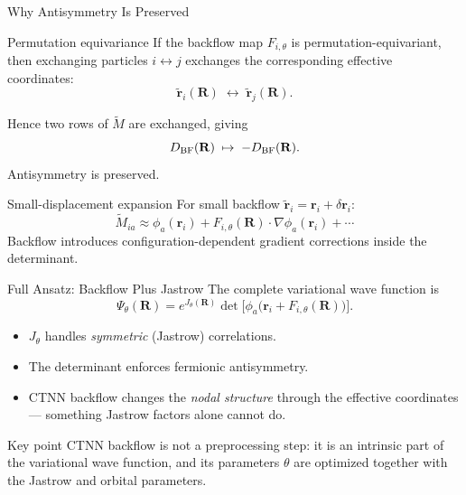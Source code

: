 \documentclass[aspectratio=169,10pt]{beamer}
\begin{document}
\begin{frame}{Why Antisymmetry Is Preserved}
\begin{block}{Permutation equivariance}
  If the backflow map $F_{i,\theta}$ is permutation-equivariant,
  then exchanging particles $i\leftrightarrow j$ exchanges the
  corresponding effective coordinates:
  \[
    \tilde{\mathbf{r}}_i(\mathbf{R})
    \;\longleftrightarrow\;
    \tilde{\mathbf{r}}_j(\mathbf{R}).
  \]
\end{block}
\vspace{0.2cm}
Hence two rows of $\widetilde{M}$ are exchanged, giving
\[
  D_{\rm BF}(\mathbf{R})\;\mapsto\;-D_{\rm BF}(\mathbf{R}).
\]
Antisymmetry is preserved. \checkmark
\vspace{0.3cm}
\begin{block}{Small-displacement expansion}
  For small backflow $\tilde{\mathbf{r}}_i=\mathbf{r}_i+\delta\mathbf{r}_i$:
  \[
    \widetilde{M}_{ia}
    \approx \phi_a(\mathbf{r}_i)
      + F_{i,\theta}(\mathbf{R})\cdot\nabla\phi_a(\mathbf{r}_i)+\cdots
  \]
  Backflow introduces configuration-dependent gradient corrections
  inside the determinant.
\end{block}
\end{frame}

\begin{frame}{Full Ansatz: Backflow Plus Jastrow}
The complete variational wave function is
\[
  \Psi_\theta(\mathbf{R})
  = e^{J_\theta(\mathbf{R})}
    \det\!\bigl[\phi_a\!\bigl(\mathbf{r}_i+F_{i,\theta}(\mathbf{R})\bigr)\bigr].
\]
\begin{itemize}
  \item $J_\theta$ handles \emph{symmetric} (Jastrow) correlations.
  \item The determinant enforces fermionic antisymmetry.
  \item CTNN backflow changes the \emph{nodal structure} through the
        effective coordinates — something Jastrow factors alone cannot do.
\end{itemize}
\vspace{0.3cm}
\begin{alertblock}{Key point}
  CTNN backflow is not a preprocessing step: it is an intrinsic part of
  the variational wave function, and its parameters $\theta$ are
  optimized together with the Jastrow and orbital parameters.
\end{alertblock}
\end{frame}

\end{document}

